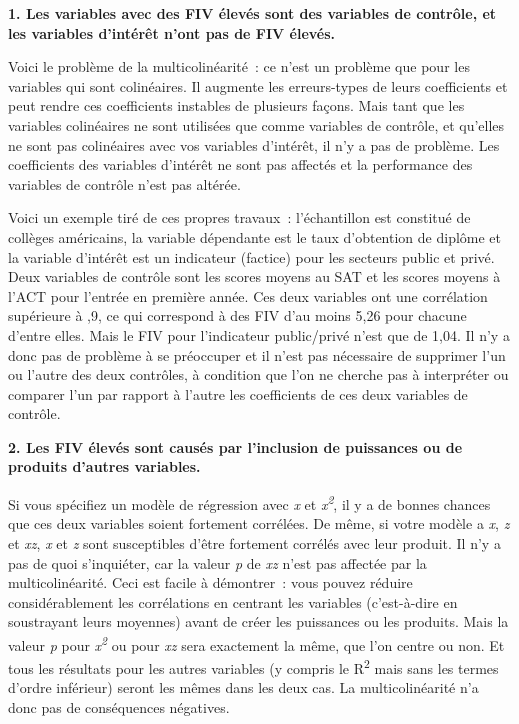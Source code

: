 \documentclass[
  letterpaper,
  DIV=11,
  numbers=noendperiod,
  oneside]{scrreprt}
\begin{document}
\textbf{1. Les variables avec des FIV élevés sont des variables de
contrôle, et les variables d'intérêt n'ont pas de FIV élevés.}

Voici le problème de la multicolinéarité~: ce n'est un problème que pour
les variables qui sont colinéaires. Il augmente les erreurs-types de
leurs coefficients et peut rendre ces coefficients instables de
plusieurs façons. Mais tant que les variables colinéaires ne sont
utilisées que comme variables de contrôle, et qu'elles ne sont pas
colinéaires avec vos variables d'intérêt, il n'y a pas de problème. Les
coefficients des variables d'intérêt ne sont pas affectés et la
performance des variables de contrôle n'est pas altérée.

Voici un exemple tiré de ces propres travaux~: l'échantillon est
constitué de collèges américains, la variable dépendante est le taux
d'obtention de diplôme et la variable d'intérêt est un indicateur
(factice) pour les secteurs public et privé. Deux variables de contrôle
sont les scores moyens au SAT et les scores moyens à l'ACT pour l'entrée
en première année. Ces deux variables ont une corrélation supérieure à
,9, ce qui correspond à des FIV d'au moins 5,26 pour chacune d'entre
elles. Mais le FIV pour l'indicateur public/privé n'est que de 1,04. Il
n'y a donc pas de problème à se préoccuper et il n'est pas nécessaire de
supprimer l'un ou l'autre des deux contrôles, à condition que l'on ne
cherche pas à interpréter ou comparer l'un par rapport à l'autre les
coefficients de ces deux variables de contrôle.

\textbf{2. Les FIV élevés sont causés par l'inclusion de puissances ou
de produits d'autres variables.}

Si vous spécifiez un modèle de régression avec \emph{x} et
\emph{x\textsuperscript{2}}, il y a de bonnes chances que ces deux
variables soient fortement corrélées. De même, si votre modèle a
\emph{x}, \emph{z} et \emph{xz}, \emph{x} et \emph{z} sont susceptibles
d'être fortement corrélés avec leur produit. Il n'y a pas de quoi
s'inquiéter, car la valeur \emph{p} de \emph{xz} n'est pas affectée par
la multicolinéarité. Ceci est facile à démontrer~: vous pouvez réduire
considérablement les corrélations en centrant les variables
(c'est-à-dire en soustrayant leurs moyennes) avant de créer les
puissances ou les produits. Mais la valeur \emph{p} pour
\emph{x\textsuperscript{2}} ou pour \emph{xz} sera exactement la même,
que l'on centre ou non. Et tous les résultats pour les autres variables
(y compris le R\textsuperscript{2} mais sans les termes d'ordre
inférieur) seront les mêmes dans les deux cas. La multicolinéarité n'a
donc pas de conséquences négatives.
\end{document}

